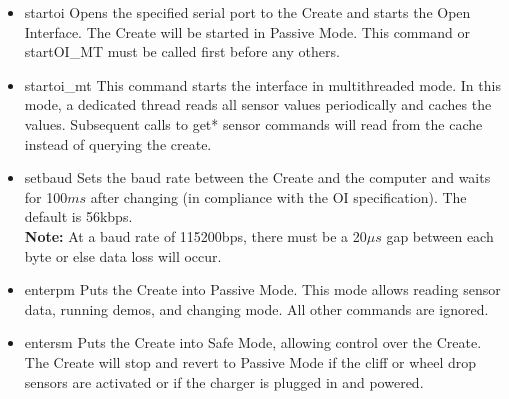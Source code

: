 \documentclass {article}
\begin{document}
\begin {itemize}

\item {} {startoi} Opens the
  specified serial port to the Create and starts the Open Interface.
  The Create will be started in Passive Mode.  This command or
  startOI\_MT must be called first before any others.
  \\
  \retnorm

\item {} {startoi_mt}
   	This command starts the interface in multithreaded mode.  In 
       this mode, a dedicated thread reads all sensor values periodically
       and caches the values.  Subsequent calls to get* sensor commands
      will read from the cache instead of querying the create. \\
  \retnorm
 
\item {} {setbaud} Sets the baud
  rate between the Create and the computer and waits for 100$ms$ after
  changing
  (in compliance with the OI specification).  The default is 56kbps. \\
  {\bf Note:} At a baud rate of 115200bps, there must be a 20$\mu s$
  gap between each byte
  or else data loss will occur. \\
  \retnorm

\item {} {enterpm} Puts the Create into
  Passive Mode.  This mode allows reading sensor data, running demos,
  and
  changing mode.  All other commands are ignored. \\
  \retnorm

\item {} {entersm} Puts the Create into
  Safe Mode, allowing control over the Create.  The Create will stop
  and revert to Passive Mode if the cliff or wheel drop sensors are
  activated or if the charger is
  plugged in and powered. \\
  \retnorm


\end{itemize}
\end{document}
